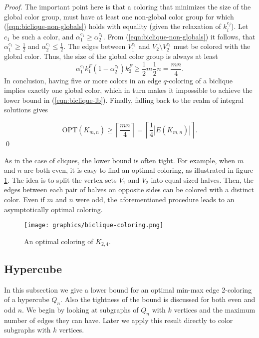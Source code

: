 \documentclass[runningheads, a4paper]{llncs}
\begin{document}
\begin{proof}
The important point here is that a coloring that minimizes the size of the global color group, must have at least one non-global color group for which (\ref{eqn:biclique-non-globals}) holds with equality (given the relaxation of $k_i^{c_j}$). Let $c_1$ be such a color, and $\alpha_1^{c_1} \geq \alpha_2^{c_1}$. From (\ref{eqn:biclique-non-globals}) it follows, that $\alpha_1^{c_1} \geq \frac{1}{2}$ and $\alpha_2^{c_1} \leq \frac{1}{2}$. The edges between $V_1^{c_1}$ and $V_2 \setminus V_2^{c_1}$ must be colored with the global color. Thus, the size of the global color group is always at least
\begin{equation}
\alpha_1^{c_1}k_1^F(1 - \alpha_2^{c_1})k_2^F \geq \frac{1}{2}m \frac{1}{2}n = \frac{mn}{4}.
\end{equation}
In conclusion, having five or more colors in an edge $q$-coloring of a biclique implies exactly one global color, which in turn makes it impossible to achieve the lower bound in (\ref{eqn:biclique-lb}). Finally, falling back to the realm of integral solutions gives

\begin{equation}
\textrm{OPT}(K_{m,n}) \geq \left\lceil \frac{mn}{4} \right\rceil = \left\lceil \frac{1}{4}|E(K_{m,n})| \right\rceil.
\end{equation} \qed
\end{proof}

As in the case of cliques, the lower bound is often tight. For example, when $m$ and $n$ are both even, it is easy to find an optimal coloring, as illustrated in figure \ref{img:biclique-coloring}. The idea is to split the vertex sets $V_1$ and $V_2$ into equal sized halves. Then, the edges between each pair of halves on opposite sides can be colored with a distinct color. Even if $m$ and $n$ were odd, the aforementioned procedure leads to an asymptotically optimal coloring.

\begin{figure}[htb]
\centering \texttt{[image: graphics/biclique-coloring.png]}
\caption{An optimal coloring of $K_{2,4}$.}\label{img:biclique-coloring}
\end{figure}

\subsection{Hypercube}\label{sssect:hypercube}

In this subsection we give a lower bound for an optimal min-max edge 2-coloring of a hypercube $Q_n$. Also the tightness of the bound is discussed for both even and odd $n$. We begin by looking at subgraphs of $Q_n$ with $k$ vertices and the maximum number of edges they can have. Later we apply this result directly to color subgraphs with $k$ vertices.
\end{document}
